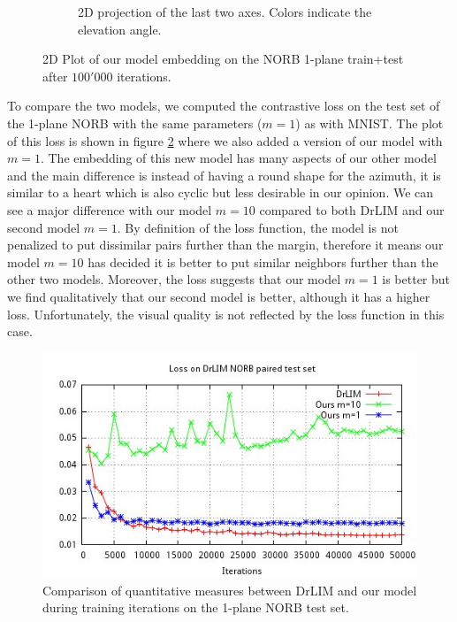 \documentclass[a4paper,12pt]{report}
\begin{document}
\begin{figure}[h]
\begin{subfigure}{0.45\textwidth}
        \caption{2D projection of the last two axes. Colors indicate the elevation angle.}
    \end{subfigure}
    \caption{2D Plot of our model embedding on the NORB 1-plane train+test after $100'000$ iterations.}
    \label{fig:norb_cl2d_embedding}
\end{figure}

To compare the two models, we computed the contrastive loss on the test set of the 1-plane NORB with the same parameters ($m=1$) as with MNIST.
The plot of this loss is shown in figure \ref{fig:loss_norb_test_common} where we also added a version of our model with $m=1$.
The embedding of this new model has many aspects of our other model and the main difference is instead of having a round shape for the azimuth, it is similar to a heart which is also cyclic but less desirable in our opinion.
We can see a major difference with our model $m=10$ compared to both DrLIM and our second model $m=1$.
By definition of the loss function, the model is not penalized to put dissimilar pairs further than the margin, therefore it means our model $m=10$ has decided it is better to put similar neighbors further than the other two models.
Moreover, the loss suggests that our model $m=1$ is better but we find qualitatively that our second model is better, although it has a higher loss.
Unfortunately, the visual quality is not reflected by the loss function in this case.

\begin{figure}[h]
    \begin{center}
        \includegraphics{thesis_figures/final_loss_testv3.jpg}
    \end{center}
    \caption{Comparison of quantitative measures between DrLIM and our model during training iterations on the 1-plane NORB test set.}
    \label{fig:loss_norb_test_common}
\end{figure}
\end{document}
